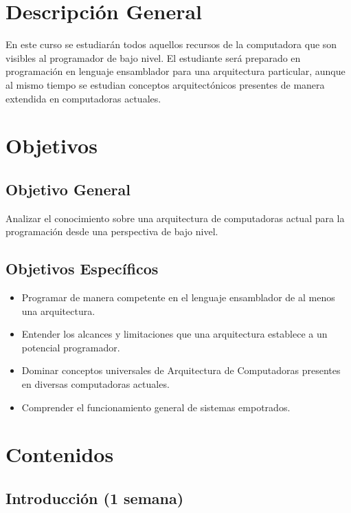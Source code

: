 \documentclass[11pt,fleqn]{report}
\providecommand{\tightlist}{%
	  \setlength{\itemsep}{0pt}\setlength{\parskip}{0pt}}
\begin{document}
\setcounter{section}{1}

\newpage
\section{Descripción General}\label{descripciuxf3n-general}

En este curso se estudiarán todos aquellos recursos de la computadora
que son visibles al programador de bajo nivel. El estudiante será
preparado en programación en lenguaje ensamblador para una arquitectura
particular, aunque al mismo tiempo se estudian conceptos arquitectónicos
presentes de manera extendida en computadoras actuales.

\section{Objetivos}\label{objetivos}

\subsection{Objetivo General}\label{objetivo-general}

Analizar el conocimiento sobre una arquitectura de computadoras actual
para la programación desde una perspectiva de bajo nivel.

\subsection{Objetivos Específicos}\label{objetivos-especuxedficos}

\begin{itemize}
\tightlist
\item
  Programar de manera competente en el lenguaje ensamblador de al menos
  una arquitectura.
\item
  Entender los alcances y limitaciones que una arquitectura establece a
  un potencial programador.
\item
  Dominar conceptos universales de Arquitectura de Computadoras
  presentes en diversas computadoras actuales.
\item
  Comprender el funcionamiento general de sistemas empotrados.
\end{itemize}

\section{Contenidos}\label{contenidos}

\subsection{Introducción (1 semana)}\label{introducciuxf3n-1-semana}
\end{document}
